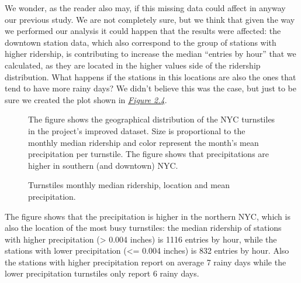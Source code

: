 \documentclass[a4paper,12pt,english]{sphinxmanual}
\begin{document}
We wonder, as the reader also may, if this missing data could affect in anyway
our previous study. We are not completely sure, but we think that given the way
we performed our analysis it could happen that the results were affected: the
downtown station data, which also correspond to the group of stations with
higher ridership, is contributing to increase the median ``entries by hour'' that
we calculated, as they are located in the higher values side of the ridership
distribution. What happens if the stations in this locations are also the ones
that tend to have more rainy days? We didn't believe this was the case, but just
to be sure we created the plot shown in {\hyperref[section1:figure24]{\emph{Figure 2.4}}}.
\begin{figure}[htbp]
\centering
\capstart

\caption{Turnstiles monthly median ridership, location and mean precipitation.}{\small 
The figure shows the geographical distribution of the NYC turnstiles in the
project's improved dataset. Size is proportional to the monthly median
ridership and color represent the month's mean precipitation per turnstile.
The figure shows that precipitations are higher in southern (and downtown)
NYC.
}\label{section1:figure24}\end{figure}

The figure shows that the precipitation is higher in the northern NYC, which is
also the location of the most busy turnstiles: the median ridership of stations
with higher precipitation (\textgreater{} 0.004 inches) is 1116 entries by hour, while the
stations with lower precipitation (\textless{}= 0.004 inches) is 832 entries by hour. Also
the stations with higher precipitation report on average 7 rainy days while the
lower precipitation turnstiles only report 6 rainy days.
\end{document}
